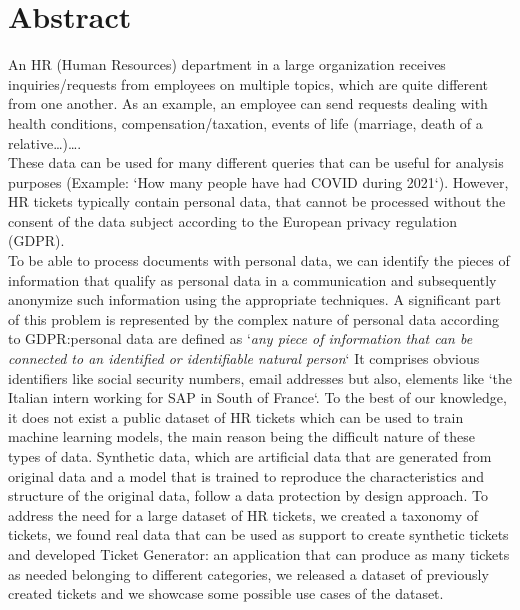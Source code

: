 \chapter*{Abstract}

An HR (Human Resources) department in a large organization receives inquiries\slash requests from employees on multiple topics, which are quite different from one another. As an example, an employee can send requests dealing with health conditions, compensation/taxation, events of life (marriage, death of a relative\dots)\dots. \\
These data can be used for many different queries that can be useful for analysis purposes (Example: `How many people have had COVID during 2021`). However, HR tickets typically contain personal data, that cannot be processed without the consent of the data subject according to the European privacy regulation (GDPR). \\
To be able to process documents with personal data, we can identify the pieces of information that qualify as personal data in a communication and subsequently anonymize such information using the appropriate techniques.
A significant part of this problem is represented by the complex nature of personal data according to GDPR:\@ personal data are defined as `\textit{any piece of information that can be connected to an identified or identifiable natural person}` It comprises obvious identifiers like social security numbers, email addresses but also, elements like `the Italian intern working for SAP in South of France`.
To the best of our knowledge, it does not exist a public dataset of HR tickets which can be used to train machine learning models, the main reason being the difficult nature of these types of data. Synthetic data, which are artificial data that are generated from original data and a model that is trained to reproduce the characteristics and structure of the original data, follow a data protection by design approach.
To address the need for a large dataset of HR tickets, we created a taxonomy of tickets, we found real data that can be used as support to create synthetic tickets and developed Ticket Generator: an application that can produce as many tickets as needed belonging to different categories, we released a dataset of previously created tickets and we showcase some possible use cases of the dataset.

